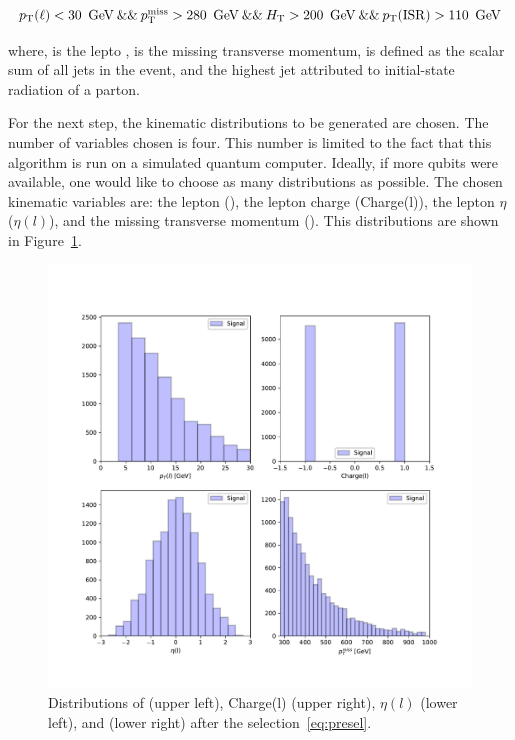 \begin{linenomath}
\begin{equation}
\resizebox{\hsize}{!}{$\ptl < 30~\GeV\:\&\&\:\ptmiss > 280~\GeV\:\&\&\:\HT > 200~\GeV\:\&\&\:\ptisr>110~\GeV$}
\label{eq:presel}
\end{equation}
\end{linenomath}
where, \ptl is the lepto \pt, \ptmiss is the missing transverse momentum, \HT is
defined as the scalar \pt sum of all jets in the event, and \ptisr the highest 
jet \pt attributed to initial-state radiation of a parton.

For the next step, the kinematic distributions to be generated are chosen. The 
number of variables chosen is four. This number is limited to the fact that this
algorithm is run on a simulated quantum computer. Ideally, if more qubits were
available, one would like to choose as many distributions as possible. The 
chosen kinematic variables are: the lepton \pt (\ptl), the lepton charge (Charge(l)),
the lepton $\eta$ ($\eta(l)$), and the missing transverse momentum (\ptmiss). This
distributions are shown in Figure~\ref{fig:features}.

\begin{figure}[!htbp]
\centering
    \includegraphics[width=1\textwidth]{figures/features.pdf}
\caption{Distributions of \ptl (upper left), Charge(l) (upper right), $\eta(l)$ 
    (lower left), and \ptmiss (lower right) after the selection~\ref{eq:presel}.}
\label{fig:features}
\end{figure}

